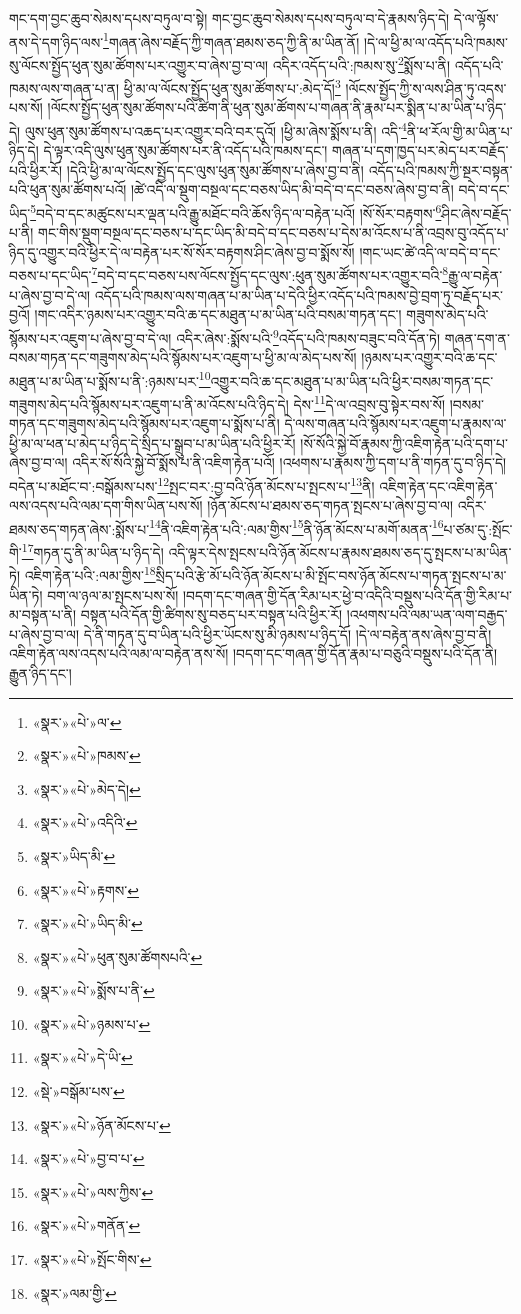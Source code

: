 གང་དག་བྱང་ཆུབ་སེམས་དཔས་བཏུལ་བ་སྟེ། གང་བྱང་ཆུབ་སེམས་དཔས་བཏུལ་བ་དེ་རྣམས་ཉིད་དེ། དེ་ལ་ལྟོས་ནས་དེ་དག་ཉིད་ལས་\footnote{«སྣར་»«པེ་»ལ་}གཞན་ཞེས་བརྗོད་ཀྱི་གཞན་ཐམས་ཅད་ཀྱི་ནི་མ་ཡིན་ནོ། །དེ་ལ་ཕྱི་མ་ལ་འདོད་པའི་ཁམས་སུ་ལོངས་སྤྱོད་ཕུན་སུམ་ཚོགས་པར་འགྱུར་བ་ཞེས་བྱ་བ་ལ། འདིར་འདོད་པའི་:ཁམས་སུ་\footnote{«སྣར་»«པེ་»ཁམས་}སྨོས་པ་ནི། འདོད་པའི་ཁམས་ལས་གཞན་པ་ན། ཕྱི་མ་ལ་ལོངས་སྤྱོད་ཕུན་སུམ་ཚོགས་པ་:མེད་དོ།\footnote{«སྣར་»«པེ་»མེད་དེ།} །ལོངས་སྤྱོད་ཀྱི་ས་ལས་ཤིན་ཏུ་འདས་པས་སོ། །ལོངས་སྤྱོད་ཕུན་སུམ་ཚོགས་པའི་ཚིག་ནི་ཕུན་སུམ་ཚོགས་པ་གཞན་ནི་རྣམ་པར་སྨིན་པ་མ་ཡིན་པ་ཉིད་དེ། ལུས་ཕུན་སུམ་ཚོགས་པ་འཆད་པར་འགྱུར་བའི་བར་དུའོ། །ཕྱི་མ་ཞེས་སྨོས་པ་ནི། འདི་\footnote{«སྣར་»«པེ་»འདིའི་}ནི་ཕ་རོལ་གྱི་མ་ཡིན་པ་ཉིད་དེ། དེ་ལྟར་འདི་ལུས་ཕུན་སུམ་ཚོགས་པར་ནི་འདོད་པའི་ཁམས་དང་། གཞན་པ་དག་ཁྱད་པར་མེད་པར་བརྗོད་པའི་ཕྱིར་རོ། །དེའི་ཕྱི་མ་ལ་ལོངས་སྤྱོད་དང་ལུས་ཕུན་སུམ་ཚོགས་པ་ཞེས་བྱ་བ་ནི། འདོད་པའི་ཁམས་ཀྱི་སྔར་བསྟན་པའི་ཕུན་སུམ་ཚོགས་པའོ། །ཚེ་འདི་ལ་སྡུག་བསྔལ་དང་བཅས་ཡིད་མི་བདེ་བ་དང་བཅས་ཞེས་བྱ་བ་ནི། བདེ་བ་དང་ཡིད་\footnote{«སྣར་»ཡིད་མི་}བདེ་བ་དང་མཚུངས་པར་ལྡན་པའི་རྒྱུ་མཐོང་བའི་ཆོས་ཉིད་ལ་བརྟེན་པའོ། །སོ་སོར་བརྟགས་\footnote{«སྣར་»«པེ་»རྟགས་}ཤིང་ཞེས་བརྗོད་པ་ནི། གང་གིས་སྡུག་བསྔལ་དང་བཅས་པ་དང་ཡིད་མི་བདེ་བ་དང་བཅས་པ་དེས་མ་འོངས་པ་ནི་འབྲས་བུ་འདོད་པ་ཉིད་དུ་འགྱུར་བའི་ཕྱིར་དེ་ལ་བརྟེན་པར་སོ་སོར་བརྟགས་ཤིང་ཞེས་བྱ་བ་སྨོས་སོ། །གང་ཡང་ཚེ་འདི་ལ་བདེ་བ་དང་བཅས་པ་དང་ཡིད་\footnote{«སྣར་»«པེ་»ཡིད་མི་}བདེ་བ་དང་བཅས་པས་ལོངས་སྤྱོད་དང་ལུས་:ཕུན་སུམ་ཚོགས་པར་འགྱུར་བའི་\footnote{«སྣར་»«པེ་»ཕུན་སུམ་ཚོགསཔའི་}རྒྱུ་ལ་བརྟེན་པ་ཞེས་བྱ་བ་དེ་ལ། འདོད་པའི་ཁམས་ལས་གཞན་པ་མ་ཡིན་པ་དེའི་ཕྱིར་འདོད་པའི་ཁམས་བྱེ་བྲག་ཏུ་བརྗོད་པར་བྱའོ། །གང་འདིར་ཉམས་པར་འགྱུར་བའི་ཆ་དང་མཐུན་པ་མ་ཡིན་པའི་བསམ་གཏན་དང་། གཟུགས་མེད་པའི་སྙོམས་པར་འཇུག་པ་ཞེས་བྱ་བ་དེ་ལ། འདིར་ཞེས་:སྨོས་པའི་\footnote{«སྣར་»«པེ་»སྨོས་པ་ནི་}འདོད་པའི་ཁམས་བཟུང་བའི་དོན་ཏེ། གཞན་དག་ན་བསམ་གཏན་དང་གཟུགས་མེད་པའི་སྙོམས་པར་འཇུག་པ་ཕྱི་མ་ལ་མེད་པས་སོ། །ཉམས་པར་འགྱུར་བའི་ཆ་དང་མཐུན་པ་མ་ཡིན་པ་སྨོས་པ་ནི་:ཉམས་པར་\footnote{«སྣར་»«པེ་»ཉམས་པ་}འགྱུར་བའི་ཆ་དང་མཐུན་པ་མ་ཡིན་པའི་ཕྱིར་བསམ་གཏན་དང་གཟུགས་མེད་པའི་སྙོམས་པར་འཇུག་པ་ནི་མ་འོངས་པའི་ཉིད་དེ། དེས་\footnote{«སྣར་»«པེ་»དེ་ཡི་}དེ་ལ་འབྲས་བུ་སྟེར་བས་སོ། །བསམ་གཏན་དང་གཟུགས་མེད་པའི་སྙོམས་པར་འཇུག་པ་སྨོས་པ་ནི། དེ་ལས་གཞན་པའི་སྙོམས་པར་འཇུག་པ་རྣམས་ལ་ཕྱི་མ་ལ་ཕན་པ་མེད་པ་ཉིད་དེ་སྲིད་པ་སྒྲུབ་པ་མ་ཡིན་པའི་ཕྱིར་རོ། །སོ་སོའི་སྐྱེ་བོ་རྣམས་ཀྱི་འཇིག་རྟེན་པའི་དག་པ་ཞེས་བྱ་བ་ལ། འདིར་སོ་སོའི་སྐྱེ་བོ་སྨོས་པ་ནི་འཇིག་རྟེན་པའོ། །འཕགས་པ་རྣམས་ཀྱི་དག་པ་ནི་གཏན་དུ་བ་ཉིད་དེ། བདེན་པ་མཐོང་བ་:བསྒོམས་པས་\footnote{«སྡེ་»བསྒོམ་པས་}སྤང་བར་:བྱ་བའི་ཉོན་མོངས་པ་སྤངས་པ་\footnote{«སྣར་»«པེ་»ཉོན་མོངས་པ་}ནི། འཇིག་རྟེན་དང་འཇིག་རྟེན་ལས་འདས་པའི་ལམ་དག་གིས་ཡིན་པས་སོ། །ཉོན་མོངས་པ་ཐམས་ཅད་གཏན་སྤངས་པ་ཞེས་བྱ་བ་ལ། འདིར་ཐམས་ཅད་གཏན་ཞེས་:སྨོས་པ་\footnote{«སྣར་»«པེ་»བྱ་བ་པ་}ནི་འཇིག་རྟེན་པའི་:ལམ་གྱིས་\footnote{«སྣར་»«པེ་»ལས་ཀྱིས་}ནི་ཉོན་མོངས་པ་མགོ་མནན་\footnote{«སྣར་»«པེ་»གནོན་}པ་ཙམ་དུ་:སྤོང་གི་\footnote{«སྣར་»«པེ་»སྤོང་གིས་}གཏན་དུ་ནི་མ་ཡིན་པ་ཉིད་དེ། འདི་ལྟར་དེས་སྤངས་པའི་ཉོན་མོངས་པ་རྣམས་ཐམས་ཅད་དུ་སྤངས་པ་མ་ཡིན་ཏེ། འཇིག་རྟེན་པའི་:ལམ་གྱིས་\footnote{«སྣར་»ལམ་གྱི་}སྲིད་པའི་རྩེ་མོ་པའི་ཉོན་མོངས་པ་མི་སྤོང་བས་ཉོན་མོངས་པ་གཏན་སྤངས་པ་མ་ཡིན་ཏེ། བག་ལ་ཉལ་མ་སྤངས་པས་སོ། །བདག་དང་གཞན་གྱི་དོན་རིམ་པར་ཕྱེ་བ་འདིའི་བསྡུས་པའི་དོན་གྱི་རིམ་པ་མ་བསྟན་པ་ནི། བསྟན་པའི་དོན་གྱི་ཚིགས་སུ་བཅད་པར་བསྟན་པའི་ཕྱིར་རོ། །འཕགས་པའི་ལམ་ཡན་ལག་བརྒྱད་པ་ཞེས་བྱ་བ་ལ། དེ་ནི་གཏན་དུ་བ་ཡིན་པའི་ཕྱིར་ཡོངས་སུ་མི་ཉམས་པ་ཉིད་དོ། །དེ་ལ་བརྟེན་ནས་ཞེས་བྱ་བ་ནི། འཇིག་རྟེན་ལས་འདས་པའི་ལམ་ལ་བརྟེན་ནས་སོ། །བདག་དང་གཞན་གྱི་དོན་རྣམ་པ་བཅུའི་བསྡུས་པའི་དོན་ནི། རྒྱུན་ཉིད་དང་། 